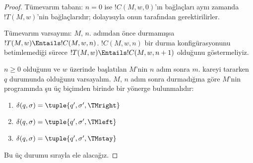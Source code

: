 \begin{proof}
Tümevarım tabanı: $n=0$ ise $!C(M,w,0)$'ın bağlaçları aynı zamanda
$!T(M,w)$'nin bağlaçlarıdır; dolayısıyla onun tarafından gerektirilirler.

Tümevarım varsayımı: $M$, $n$. adımdan önce durmamışsa
$!T(M,w)\Entails !C(M,w,n)$. $!C(M,w,n)$ bir durma konfigürasyonunu
betimlemediği sürece $!T(M,w)\Entails !C(M,w,n+1)$ olduğunu göstermeliyiz.

$n\ge 0$ olduğunu ve $w$ üzerinde başlatılan $M$'nin $n$ adım sonra $m$.
kareyi tararken $q$ durumunda olduğunu varsayalım. $M$, $n$ adım sonra
durmadığına göre $M$'nin programında şu üç biçimden birinde bir yönerge
bulunmalıdır:

\begin{enumerate} 
\item {} $\delta(q, \sigma) = \tuple{q', \sigma', \TMright}$

\item {} $\delta(q, \sigma) = \tuple{q', \sigma', \TMleft}$

\item {} $\delta(q, \sigma) = \tuple{q', \sigma', \TMstay}$
\end{enumerate}

Bu üç durumu sırayla ele alacağız.


\end{proof}
